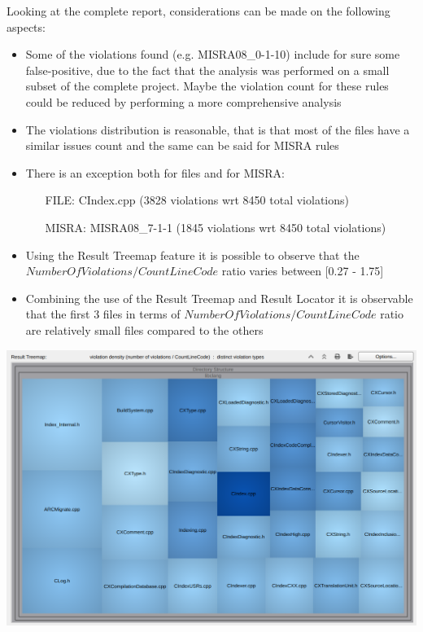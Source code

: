 Looking at the complete report, considerations can be made on the following aspects:

\begin{itemize}
	\item Some of the violations found (e.g. MISRA08\_0-1-10) include for sure some false-positive, due to the fact that the analysis was performed on a small subset of the complete project. Maybe the violation count for these rules could be reduced by performing a more comprehensive analysis
	\item The violations distribution is reasonable, that is that most of the files have a similar issues count and the same can be said for MISRA rules
	\item There is an exception both for files and for MISRA:
	\begin{itemize}
		\item[FILE: ] CIndex.cpp (3828 violations wrt 8450 total violations)
		\item[MISRA: ] MISRA08\_7-1-1 (1845 violations wrt 8450 total violations)
	\end{itemize}
	\item Using the Result Treemap feature it is possible to observe that the $NumberOfViolations/CountLineCode$ ratio varies between [0.27 - 1.75]
	\item Combining the use of the Result Treemap and Result Locator it is observable that the first 3 files in terms of $NumberOfViolations/CountLineCode$ ratio are relatively small files compared to the others
	
\end{itemize}

\vspace{1cm}

\begin{minipage}{\linewidth}
	\includegraphics[width=\textwidth]{img/TreemapCountLine.png}
\end{minipage}
\pagebreak

